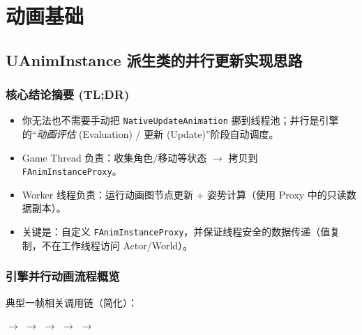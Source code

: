 \documentclass[10pt,openright,oneside,CJKmath]{MyBook}
\begin{document}
\mainmatter



\chapter{动画基础}
\section{UAnimInstance 派生类的并行更新实现思路}

\subsection{核心结论摘要 (TL;DR)}
\begin{itemize}
  \item 你无法也不需要手动把 \texttt{NativeUpdateAnimation} 挪到线程池；并行是引擎的“\emph{动画评估} (Evaluation) / 更新 (Update)”阶段自动调度。
  \item Game Thread 负责：收集角色/移动等状态 $\rightarrow$ 拷贝到 \texttt{FAnimInstanceProxy}。
  \item Worker 线程负责：运行动画图节点更新 + 姿势计算（使用 Proxy 中的只读数据副本）。
  \item 关键是：自定义 \texttt{FAnimInstanceProxy}，并保证线程安全的数据传递（值复制，不在工作线程访问 Actor/World）。
\end{itemize}

\subsection{引擎并行动画流程概览}
典型一帧相关调用链（简化）：

 $\rightarrow$  $\rightarrow$
 $\rightarrow$  $\rightarrow$  $\rightarrow$
\end{document}
